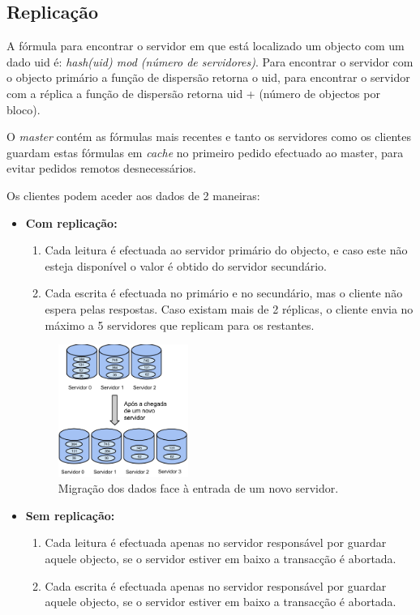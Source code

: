 \subsection{Replicação}

A fórmula para encontrar o servidor em que está localizado um objecto com um dado uid é: \textit{hash(uid) mod (número de servidores)}. Para encontrar o servidor com o objecto primário a função de dispersão retorna o uid, para encontrar o servidor com a réplica a função de dispersão retorna uid + (número de objectos por bloco).

O \textit{master} contém as fórmulas mais recentes e tanto os servidores como os clientes guardam estas fórmulas em \textit{cache} no primeiro pedido efectuado ao master, para evitar pedidos remotos desnecessários.

Os clientes podem aceder aos dados de 2 maneiras:

\begin{itemize}
\item \textbf{Com replicação:} 

\begin{enumerate}
\item Cada leitura é efectuada ao servidor primário do objecto, e caso este não esteja disponível o valor é obtido do servidor secundário.

\item Cada escrita é efectuada no primário e no secundário, mas o cliente não espera pelas respostas. Caso existam mais de 2 réplicas, o cliente envia no máximo a 5 servidores que replicam para os restantes.
\end{enumerate}

\begin{figure}
\centering
\includegraphics[width=0.4\textwidth]{migracao.png}
\caption{\label{fig:migracao}Migração dos dados face à entrada de um novo servidor.}
\end{figure}

\item \textbf{Sem replicação:}

\begin{enumerate}
\item Cada leitura é efectuada apenas no servidor responsável por guardar aquele objecto, se o servidor estiver em baixo a transacção é abortada.

\item Cada escrita é efectuada apenas no servidor responsável por guardar aquele objecto, se o servidor estiver em baixo a transacção é abortada.
\end{enumerate}
\end{itemize}